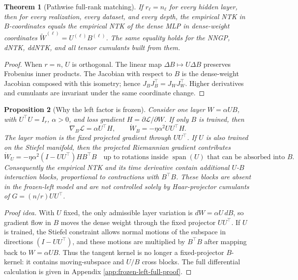 \documentclass{article}
\newtheorem{theorem}{Theorem}[section]
\newtheorem{proposition}[theorem]{Proposition}
\newcommand{\wt}{\widetilde}
\begin{document}
\begin{theorem}[Pathwise full-rank matching]
\label{thm:pathwise}
If \(r_\ell=n_\ell\) for every hidden layer, then for every realization, every dataset, and every depth, the empirical NTK in \(B\)-coordinates equals the empirical NTK of the dense MLP in dense-weight coordinates \(\wt W^{(\ell)}=U^{(\ell)}B^{(\ell)}\). The same equality holds for the NNGP, dNTK, ddNTK, and all tensor cumulants built from them.
\end{theorem}

\begin{proof}
When \(r=n\), \(U\) is orthogonal. The linear map \(\Delta B\mapsto U\Delta B\) preserves Frobenius inner products. The Jacobian with respect to \(B\) is the dense-weight Jacobian composed with this isometry; hence \(J_BJ_B^\top=J_WJ_W^\top\). Higher derivatives and cumulants are invariant under the same coordinate change.
\end{proof}

\begin{proposition}[Why the left factor is frozen]
\label{prop:frozen-left}
Consider one layer \(W=\alpha UB\), with \(U^\top U=I_r\), \(\alpha>0\), and loss gradient \(H=\partial \mathcal L/\partial W\). If only \(B\) is trained, then
\begin{equation}
\nabla_B\mathcal L=\alpha U^\top H,
\qquad
\dot W_B=-\eta\alpha^2UU^\top H.
\label{eq:frozen-left-flow}
\end{equation}
The layer motion is the fixed projected gradient through \(UU^\top\). If \(U\) is also trained on the Stiefel manifold, then the projected Riemannian gradient contributes
\begin{equation}
\dot W_U
=-\eta\alpha^2 (I-UU^\top)H B^\top B
\quad
\text{up to rotations inside } \operatorname{span}(U)\text{ that can be absorbed into }B.
\label{eq:moving-left-flow}
\end{equation}
Consequently the empirical NTK and its time derivative contain additional \(U\)-\(B\) interaction blocks, proportional to contractions with \(B^\top B\). These blocks are absent in the frozen-left model and are not controlled solely by Haar-projector cumulants of \(G=(n/r)UU^\top\).
\end{proposition}

\begin{proof}[Proof idea]
With \(U\) fixed, the only admissible layer variation is \(dW=\alpha U\,dB\), so gradient flow in \(B\) moves the dense weight through the fixed projector \(UU^\top\). If \(U\) is trained, the Stiefel constraint allows normal motions of the subspace in directions \((I-UU^\top)\), and these motions are multiplied by \(B^\top B\) after mapping back to \(W=\alpha UB\). Thus the tangent kernel is no longer a fixed-projector \(B\)-kernel: it contains moving-subspace and \(U/B\) cross blocks. The full differential calculation is given in Appendix \ref{app:frozen-left-full-proof}.
\end{proof}
\end{document}
